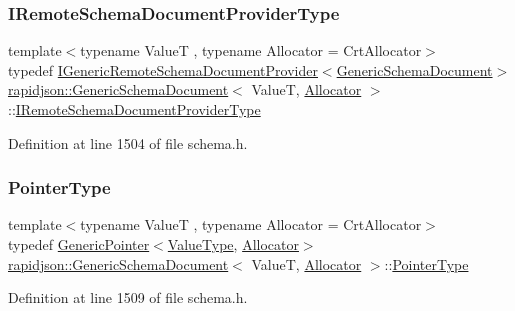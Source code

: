 \subsubsection{\texorpdfstring{IRemoteSchemaDocumentProviderType}{IRemoteSchemaDocumentProviderType}}
{\footnotesize\ttfamily template$<$typename ValueT , typename Allocator  = Crt\+Allocator$>$ \\
typedef \mbox{\hyperlink{classrapidjson_1_1_i_generic_remote_schema_document_provider}{I\+Generic\+Remote\+Schema\+Document\+Provider}}$<$\mbox{\hyperlink{classrapidjson_1_1_generic_schema_document}{Generic\+Schema\+Document}}$>$ \mbox{\hyperlink{classrapidjson_1_1_generic_schema_document}{rapidjson\+::\+Generic\+Schema\+Document}}$<$ ValueT, \mbox{\hyperlink{classrapidjson_1_1_allocator}{Allocator}} $>$\+::\mbox{\hyperlink{classrapidjson_1_1_generic_schema_document_ab2764f2258889b3262eff6293d7ca015}{I\+Remote\+Schema\+Document\+Provider\+Type}}}



Definition at line 1504 of file schema.\+h.

\mbox{\label{classrapidjson_1_1_generic_schema_document_a61540c0f8aa542760ae03257a0e6dab7}} 
\subsubsection{\texorpdfstring{PointerType}{PointerType}}
{\footnotesize\ttfamily template$<$typename ValueT , typename Allocator  = Crt\+Allocator$>$ \\
typedef \mbox{\hyperlink{classrapidjson_1_1_generic_pointer}{Generic\+Pointer}}$<$\mbox{\hyperlink{classrapidjson_1_1_generic_schema_document_a87eb1db271e7f57442802a5f4f6178f3}{Value\+Type}}, \mbox{\hyperlink{classrapidjson_1_1_allocator}{Allocator}}$>$ \mbox{\hyperlink{classrapidjson_1_1_generic_schema_document}{rapidjson\+::\+Generic\+Schema\+Document}}$<$ ValueT, \mbox{\hyperlink{classrapidjson_1_1_allocator}{Allocator}} $>$\+::\mbox{\hyperlink{classrapidjson_1_1_generic_schema_document_a61540c0f8aa542760ae03257a0e6dab7}{Pointer\+Type}}}



Definition at line 1509 of file schema.\+h.

